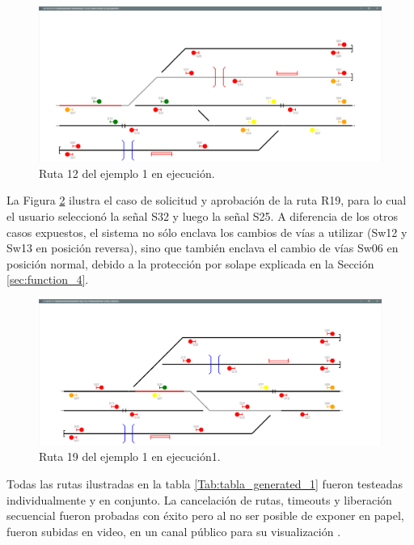 	\begin{figure}[H]
		\centering
		\includegraphics[origin = c, width=1\textwidth]{resultados-obtenidos/ejemplo1/images/AGG_R12}
		\centering\caption{Ruta 12 del ejemplo 1 en ejecución.}
		\label{fig:EJ1_AGG_R12}
	\end{figure}
	
	La Figura \ref{fig:EJ1_AGG_R19}	ilustra el caso de solicitud y aprobación de la ruta R19, para lo cual el usuario seleccionó la señal S32 y luego la señal S25. A diferencia de los otros casos expuestos, el sistema no sólo enclava los cambios de vías a utilizar (Sw12 y Sw13 en posición reversa), sino que también enclava el cambio de vías Sw06 en posición normal, debido a la protección por solape explicada en la Sección \ref{sec:function_4}.	
	
	\begin{figure}[H]
		\centering
		\includegraphics[origin = c, width=1\textwidth]{resultados-obtenidos/ejemplo1/images/AGG_R19}
		\centering\caption{Ruta 19 del ejemplo 1 en ejecución1.}
		\label{fig:EJ1_AGG_R19}
	\end{figure}
	
	Todas las rutas ilustradas en la tabla \ref{Tab:tabla_generated_1} fueron testeadas individualmente y en conjunto. La cancelación de rutas, timeouts y liberación secuencial fueron probadas con éxito pero al no ser posible de exponer en papel, fueron subidas en video, en un canal público para su visualización \cite{YOUTUBE}.	
	
	